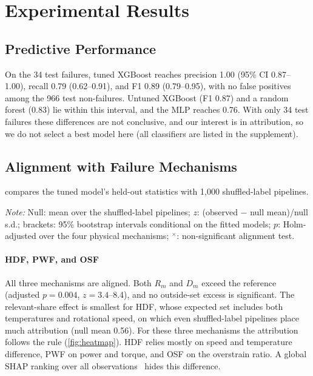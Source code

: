 \documentclass[conference]{IEEEtran}
\begin{document}
\section{Experimental Results}
\label{sec:results}

\subsection{Predictive Performance}
\label{sec:perf}

On the 34 test failures, tuned XGBoost reaches precision 1.00 (95\% CI 0.87--1.00), recall 0.79 (0.62--0.91), and F1 0.89 (0.79--0.95), with no false positives among the 966 test non-failures. Untuned XGBoost (F1 0.87) and a random forest (0.83) lie within this interval, and the MLP reaches 0.76. With only 34 test failures these differences are not conclusive, and our interest is in attribution, so we do not select a best model here (all classifiers are listed in the supplement).

\subsection{Alignment with Failure Mechanisms}
\label{sec:audit-results}

 compares the tuned model's held-out statistics with 1{,}000 shuffled-label pipelines.


\begin{table}[t]
\centering
\begin{threeparttable}
\caption{Primary audit using held-out SHAP values (seed 42, $K=1{,}000$).}
\label{tab:audit}
\footnotesize
\setlength{\tabcolsep}{4pt}

\begin{tablenotes}[flushleft]
\footnotesize
\item \textit{Note:}
Null: mean over the shuffled-label pipelines; $z$: (observed $-$ null
mean)/null s.d.; brackets: 95\% bootstrap intervals conditional on the
fitted models; $p$: Holm-adjusted over the four physical mechanisms;
$^{\times}$: non-significant alignment test.
\end{tablenotes}
\end{threeparttable}
\end{table}

\paragraph{HDF, PWF, and OSF} All three mechanisms are aligned. Both $R_m$ and $D_m$ exceed the reference (adjusted $p=0.004$, $z=3.4$--8.4), and no outside-set excess is significant. The relevant-share effect is smallest for HDF, whose expected set includes both temperatures and rotational speed, on which even shuffled-label pipelines place much attribution (null mean 0.56). For these three mechanisms the attribution follows the rule (\cref{fig:heatmap}). HDF relies mostly on speed and temperature difference, PWF on power and torque, and OSF on the overstrain ratio. A global SHAP ranking over all observations~\cite{milling2025shap} hides this difference.
\end{document}
